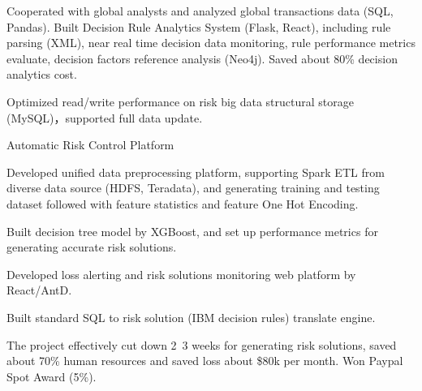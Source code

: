 \documentclass[11pt, a4paper, UTF8]{awesome-cv}
\begin{document}
\begin{cventries}
{\begin{cvitems}
        \item {Cooperated with global analysts and analyzed global transactions data (SQL, Pandas). Built Decision Rule Analytics System (Flask, React), including rule parsing (XML), near real time decision data monitoring, rule performance metrics evaluate, decision factors reference analysis (Neo4j). Saved about 80\% decision analytics cost.}
        \item {Optimized read/write performance on risk big data structural storage (MySQL)，supported full data update.}
      \end{cvitems}
    }
    
  \cventry
    {Automatic Risk Control Platform} %
    {} %
    {} %
    {\ } %
    {
      \begin{cvitems} %
        \item {Developed unified data preprocessing platform, supporting Spark ETL from diverse data source (HDFS, Teradata), and generating training and testing dataset followed with feature statistics and feature One Hot Encoding.}
        \item {Built decision tree model by XGBoost, and set up performance metrics for generating accurate risk solutions.}
        \item {Developed loss alerting and risk solutions monitoring web platform by React/AntD.}
        \item {Built standard SQL to risk solution (IBM decision rules) translate engine.}
        \item {The project effectively cut down 2~3 weeks for generating risk solutions, saved about 70\% human resources and saved loss about \$80k per month. Won Paypal Spot Award (5\%).}
      \end{cvitems}
    }


\end{cventries}
\end{document}
